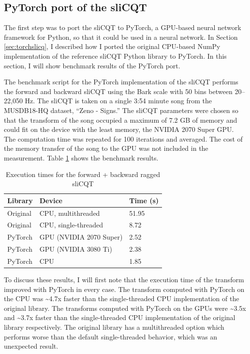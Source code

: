 \documentclass[report.tex]{subfiles}
\begin{document}
\subsection{PyTorch port of the sliCQT}
\label{sec:gpuexperimentpytorch}

The first step was to port the sliCQT to PyTorch, a GPU-based neural network framework for Python, so that it could be used in a neural network. In Section \ref{sec:torchslicq}, I described how I ported the original CPU-based NumPy implementation of the reference sliCQT Python library to PyTorch. In this section, I will show benchmark results of the PyTorch port.

The benchmark script for the PyTorch implementation of the sliCQT performs the forward and backward sliCQT using the Bark scale with 50 bins between 20--22,050 Hz. The sliCQT is taken on a single 3:54 minute song from the MUSDB18-HQ dataset, ``Zeno - Signs.'' The sliCQT parameters were chosen so that the transform of the song occupied a maximum of 7.2 GB of memory and could fit on the device with the least memory, the NVIDIA 2070 Super GPU. The computation time was repeated for 100 iterations and averaged. The cost of the memory transfer of the song to the GPU was not included in the measurement. Table \ref{table:nsgttorchresultsragged} shows the benchmark results.

\begin{table}[ht]
	\centering
	\caption{Execution times for the forward + backward ragged sliCQT}
	\label{table:nsgttorchresultsragged}
	\begin{tabular}{ |l|l|l| }
	 \hline
		Library & Device & Time (s) \\
	 \hline
	 \hline
		Original & CPU, multithreaded & 51.95 \\
	 \hline
		Original & CPU, single-threaded & 8.72 \\
	 \hline
		PyTorch & GPU (NVIDIA 2070 Super) & 2.52 \\
	 \hline
		PyTorch & GPU (NVIDIA 3080 Ti) & 2.38 \\
	 \hline
		PyTorch & CPU & 1.85 \\
	 \hline
\end{tabular}
\end{table}

To discuss these results, I will first note that the execution time of the transform improved with PyTorch in every case. The transform computed with PyTorch on the CPU was \textasciitilde4.7x faster than the single-threaded CPU implementation of the original library. The transforms computed with PyTorch on the GPUs were \textasciitilde3.5x and \textasciitilde3.7x faster than the single-threaded CPU implementation of the original library respectively. The original library has a multithreaded option which performs worse than the default single-threaded behavior, which was an unexpected result.
\end{document}
